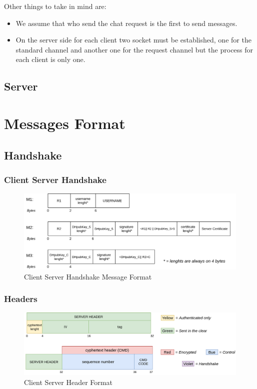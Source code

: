 \documentclass[11pt]{report}
\begin{document}
\noindent Other things to take in mind are:
\begin{itemize}
	\item We assume that who send the chat request is the first to send messages.
	\item On the server side for each client two socket must be established, one for the standard channel and another one for the request channel but the process for each client is only one.
\end{itemize}

\section{Server}

\chapter{Messages Format}

\section{Handshake}
\subsection*{Client Server Handshake}
\begin{figure}[H]
	\centering
	\includegraphics[scale=0.28]{img/AuthClientServer_messageFormat.png}
	\caption{Client Server Handshake Message Format}
	\label {img: FormatClientServer}
\end{figure}
\subsection*{Headers}
\begin{figure}[H]
	\centering
	\includegraphics[scale=0.24]{img/HeaderFormat.png}
	\caption{Client Server Header Format}
	\label {img: FormatClientServerHeader}
\end{figure}
\end{document}
